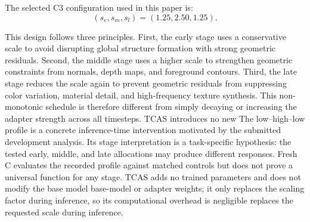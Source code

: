 \documentclass[times,twocolumn,final]{elsarticle}
\providecommand{\DIFadd}[1]{{\protect\color{blue} \sf #1}} %
\providecommand{\DIFdel}[1]{{\protect\color{red} \scriptsize #1}} %
\providecommand{\DIFaddbegin}{} %
\providecommand{\DIFaddend}{} %
\providecommand{\DIFdelbegin}{} %
\providecommand{\DIFdelend}{} %
\begin{document}
\DIFaddend The selected C3 configuration used in this paper is:
\begin{equation}
(s_e, s_m, s_l) = (1.25, 2.50, 1.25).
\end{equation}

\DIFdelbegin \DIFdel{This design follows three principles. First, the early stage uses a conservative scale to avoid disrupting global structure formation with strong geometric residuals. Second, the middle stage uses a higher scale to strengthen geometric constraints from normals, depth maps, and foreground contours. Third, the late stage reduces the scale again to prevent geometric residuals from suppressing color variation, material detail, and high-frequency texture synthesis. This non-monotonic schedule is therefore different from simply decaying or increasing the adapter strength across all timesteps. TCAS introduces no new }\DIFdelend \DIFaddbegin \DIFadd{The low--high--low profile is a concrete inference-time intervention motivated by the submitted development analysis. Its stage interpretation is a task-specific hypothesis: the tested early, middle, and late allocations may produce different responses. Fresh C evaluates the recorded profile against matched controls but does not prove a universal function for any stage. TCAS adds no trained }\DIFaddend parameters and does not modify \DIFdelbegin \DIFdel{the base model }\DIFdelend \DIFaddbegin \DIFadd{base-model }\DIFaddend or adapter weights; it \DIFdelbegin \DIFdel{only replaces the scaling factor during inference, so its computational overhead is negligible}\DIFdelend \DIFaddbegin \DIFadd{replaces the requested scale during inference}\DIFaddend .
\end{document}
